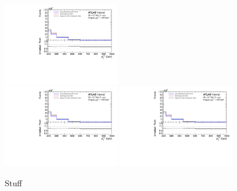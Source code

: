 \begin{figure}[h!]
  \includegraphics[page=633,width=0.45\textwidth]{figures/IBUClosureTests.pdf} \\
  \includegraphics[page=663,width=0.45\textwidth]{figures/IBUClosureTests.pdf}
  \includegraphics[page=669,width=0.45\textwidth]{figures/IBUClosureTests.pdf}
  \caption{Stuff}
  \label{fig:DDTestTJ1}
\end{figure}

